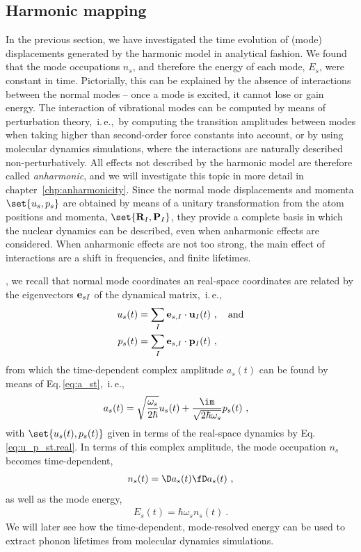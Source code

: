 \subsection{Harmonic mapping}
In the previous section, we have investigated the time evolution of (mode) displacements generated by the harmonic model in analytical fashion. We found that the mode occupations $n_s$, and therefore the energy of each mode, $E_s$, were constant in time. Pictorially, this can be explained by the absence of interactions between the normal modes -- once a mode is excited, it cannot lose or gain energy.
The interaction of vibrational modes can be computed by means of perturbation theory,~i.\,e.,~by computing the transition amplitudes between modes when taking higher than second-order force constants into account, or by using molecular dynamics simulations, where the interactions are naturally described non-perturbatively. All effects not described by the harmonic model are therefore called \emph{anharmonic}, and we will investigate this topic in more detail in chapter~\ref{chp:anharmonicity}. 
Since the normal mode displacements and momenta $\set{u_s, p_s}$ are obtained by means of a unitary transformation from the atom positions and momenta, $\set{{\bf R}_I, {\bf P}_I}$, they provide a complete basis in which the nuclear dynamics can be described, even when anharmonic effects are considered. When anharmonic effects are not too strong, the main effect of interactions are a shift in frequencies, and finite lifetimes.

, we recall that normal mode coordinates an real-space coordinates are related by the eigenvectors ${\bf e}_{sI}$ of the dynamical matrix,~i.\,e.,
%
\begin{subequations}
	\label{eq:u_p_st.real}
\begin{align}
u_s (t)
&= \sum_{I} {\bf e}_{s, I} \cdot {\bf u}_{I} (t)
~,\quad\text{and}
\label{eq:u_st.real)} \\
p_s (t)
&=\sum_{I} {\bf e}_{s, I} \cdot {\bf p}_{I} (t) ~,
\label{eq:p_st.real}
\end{align}
\end{subequations}
%
from which the time-dependent complex amplitude $a_s (t)$ can be found by means of Eq.\,\eqref{eq:a_st},~i.\,e.,
\begin{align}
		a_s (t)
		&= \sqrt{\frac{\omega_s}{2 \hbar}} u_s (t) + \frac{\im}{\sqrt{2 \hbar \omega_s}} p_s (t)~,
\end{align}
with $\set{u_s (t), p_s (t)}$ given in terms of the real-space dynamics by Eq.\,\eqref{eq:u_p_st.real}. In terms of this complex amplitude, the mode occupation $n_s$ becomes time-dependent,
\begin{align}
	n_s (t) = \D a_s (t) \fD a_s (t)~,
	\label{eq:n_s(t)}
\end{align}
as well as the mode energy,
\begin{align}
	E_s (t) = \hbar \omega_s n_s (t)~.
\end{align}
We will later see how the time-dependent, mode-resolved energy can be used to extract phonon lifetimes from molecular dynamics simulations.

